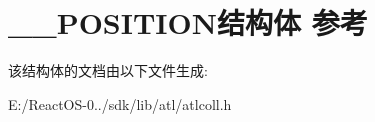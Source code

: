 \hypertarget{struct_____p_o_s_i_t_i_o_n}{}\section{\+\_\+\+\_\+\+P\+O\+S\+I\+T\+I\+O\+N结构体 参考}
\label{struct_____p_o_s_i_t_i_o_n}


该结构体的文档由以下文件生成\+:\begin{DoxyCompactItemize}
\item 
E\+:/\+React\+O\+S-\/0../sdk/lib/atl/atlcoll.\+h\end{DoxyCompactItemize}
